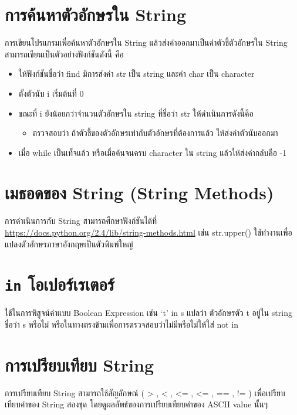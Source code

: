 \section{การค้นหาตัวอักษรใน String}

การเขียนโปรแกรมเพื่อค้นหาตัวอักษรใน String แล้วส่งค่าออกมาเป็นค่าตัวชี้ตัวอักษรใน String สามารถเขียนเป็นตัวอย่างฟังก์ชันดังนี้ คือ 

\begin{itemize}
\item ให้ฟังก์ชันชื่อว่า find มีการส่งค่า str เป็น string และค่า char เป็น character 
\item ตั้งตัวนับ i เริ่มต้นที่ 0
\item ขณะที่ i ยังน้อยกว่าจำนวนตัวอักษรใน string ที่ชื่อว่า str ให้ดำเนินการดังนี้คือ
	\begin{itemize}
		\item ตรวจสอบว่า ถ้าตัวชี้ของตัวอักษรเท่ากับตัวอักษรที่ต้องการแล้ว ให้ส่งค่าตัวนับออกมา
	\end{itemize}
\item เมื่อ while เป็นเท็จแล้ว หรือเมื่อค้นจนครบ character ใน string แล้วให้ส่งค่ากลับคือ -1
\end{itemize}

\section{เมธอดของ String (String Methods)}

การดำเนินการกับ String สามารถศึกษาฟังก์ชันได้ที่ \url{https://docs.python.org/2.4/lib/string-methods.html} เช่น str.upper() ใช้ทำงานเพื่อแปลงตัวอักษรภาษาอังกฤษเป็นตัวพิมพ์ใหญ่

\section{\texttt{in} โอเปอร์เรเตอร์}

ใช้ในการพิสูจน์ค่าแบบ Boolean Expression เช่น ‘t’ in s แปลว่า ตัวอักษรตัว t อยู่ใน string ชื่อว่า s หรือไม่ หรือในทางตรงข้ามเพื่อการตรวจสอบว่าไม่มีหรือไม่ให้ใส่ not in 

\section{การเปรียบเทียบ String}

การเปรียบเทียบ String สามารถใช้สัญลักษณ์  ( > , < , <= , <= , == , !=  ) เพื่อเปรียบเทียบค่าของ String สองชุด โดยดูผลลัพธ์ของการเปรียบเทียบค่าของ ASCII value นั้นๆ

